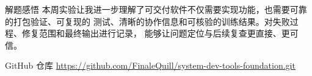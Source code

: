 \documentclass[UTF8,zihao=-4]{ctexart}
\begin{document}
\vspace{0.65cm}
\begin{summarybox}{解题感悟}
本周实验让我进一步理解了可交付软件不仅需要实现功能，也需要可靠的打包验证、可复现的
测试、清晰的协作信息和可核验的训练结果。对失败过程、修复范围和最终输出进行记录，
能够让问题定位与后续复查更直接、更可信。
\end{summarybox}

\vspace{0.55cm}
\begin{summarybox}{GitHub 仓库}
\centering
\url{https://github.com/FinaleQuill/system-dev-tools-foundation.git}
\end{summarybox}
\end{document}
